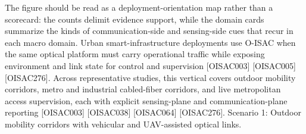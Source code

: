 {}\markdownRendererParagraphSeparator
{}The figure should be read as a deployment-orientation map rather than a scorecard: the counts delimit evidence support, while the domain cards summarize the kinds of communication-side and sensing-side cues that recur in each macro domain.\markdownRendererInterblockSeparator
{}\markdownRendererSectionBegin
\markdownRendererSectionBegin
{}\markdownRendererInterblockSeparator
{}\markdownRendererSectionBegin
{}\markdownRendererInterblockSeparator
{}Urban smart-infrastructure deployments use O-ISAC when the same optical platform must carry operational traffic while exposing environment and link state for control and supervision [O\markdownRendererUnderscore{}ISAC\markdownRendererUnderscore{}003] [O\markdownRendererUnderscore{}ISAC\markdownRendererUnderscore{}005] [O\markdownRendererUnderscore{}ISAC\markdownRendererUnderscore{}276]. Across representative studies, this vertical covers outdoor mobility corridors, metro and industrial cabled-fiber corridors, and live metropolitan access supervision, each with explicit sensing-plane and communication-plane reporting [O\markdownRendererUnderscore{}ISAC\markdownRendererUnderscore{}003] [O\markdownRendererUnderscore{}ISAC\markdownRendererUnderscore{}038] [O\markdownRendererUnderscore{}ISAC\markdownRendererUnderscore{}064] [O\markdownRendererUnderscore{}ISAC\markdownRendererUnderscore{}276].\markdownRendererInterblockSeparator
{}
\markdownRendererSectionEnd \markdownRendererSectionBegin
{}\markdownRendererInterblockSeparator
{}Scenario 1: Outdoor mobility corridors with vehicular and UAV-assisted optical links.\markdownRendererHardLineBreak
